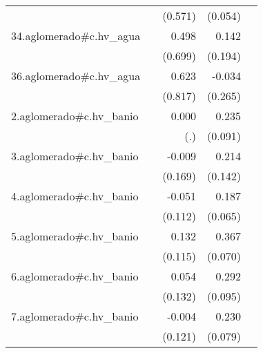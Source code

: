 {\begin{longtable}{l*{4}{D{.}{.}{-1}}}
            &                     &     (0.571)         &     (0.054)         &                     \\
\addlinespace
34.aglomerado#c.hv\_agua&                     &       0.498         &       0.142         &                     \\
            &                     &     (0.699)         &     (0.194)         &                     \\
\addlinespace
36.aglomerado#c.hv\_agua&                     &       0.623         &      -0.034         &                     \\
            &                     &     (0.817)         &     (0.265)         &                     \\
\addlinespace
2.aglomerado#c.hv\_banio&                     &       0.000         &       0.235\sym{*}  &                     \\
            &                     &         (.)         &     (0.091)         &                     \\
\addlinespace
3.aglomerado#c.hv\_banio&                     &      -0.009         &       0.214         &                     \\
            &                     &     (0.169)         &     (0.142)         &                     \\
\addlinespace
4.aglomerado#c.hv\_banio&                     &      -0.051         &       0.187\sym{**} &                     \\
            &                     &     (0.112)         &     (0.065)         &                     \\
\addlinespace
5.aglomerado#c.hv\_banio&                     &       0.132         &       0.367\sym{***}&                     \\
            &                     &     (0.115)         &     (0.070)         &                     \\
\addlinespace
6.aglomerado#c.hv\_banio&                     &       0.054         &       0.292\sym{**} &                     \\
            &                     &     (0.132)         &     (0.095)         &                     \\
\addlinespace
7.aglomerado#c.hv\_banio&                     &      -0.004         &       0.230\sym{**} &                     \\
            &                     &     (0.121)         &     (0.079)         &                     \\

\end{longtable}}

